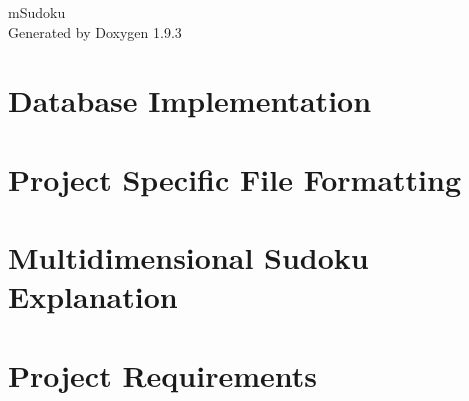 \documentclass[twoside]{book}
\newcommand{\+}{\discretionary{\mbox{\scriptsize$\hookleftarrow$}}{}{}}
\newcommand{\clearemptydoublepage}{%
    \newpage{\pagestyle{empty}\cleardoublepage}%
  }
\begin{document}
  \raggedbottom
    \hypersetup{pageanchor=false,
                bookmarksnumbered=true,
                pdfencoding=unicode
               }
  \begin{titlepage}
  \vspace*{7cm}
  \begin{center}%
  {\Large m\+Sudoku}\\
  \vspace*{1cm}
  {\large Generated by Doxygen 1.9.3}\\
  \end{center}
  \end{titlepage}
  \clearemptydoublepage
  \tableofcontents
  \clearemptydoublepage
  \hypersetup{pageanchor=true}
\chapter{Database Implementation}
\label{md__c___users_tr_user__v_s__code_multidimensional_sudoku_database}

\chapter{Project Specific File Formatting}
\label{md__c___users_tr_user__v_s__code_multidimensional_sudoku_file_formating}

\chapter{Multidimensional Sudoku Explanation}
\label{md__c___users_tr_user__v_s__code_multidimensional_sudoku_m_sudoku_explanation}

\chapter{Project Requirements}
\label{md__c___users_tr_user__v_s__code_multidimensional_sudoku_project_reqs}

\end{document}
